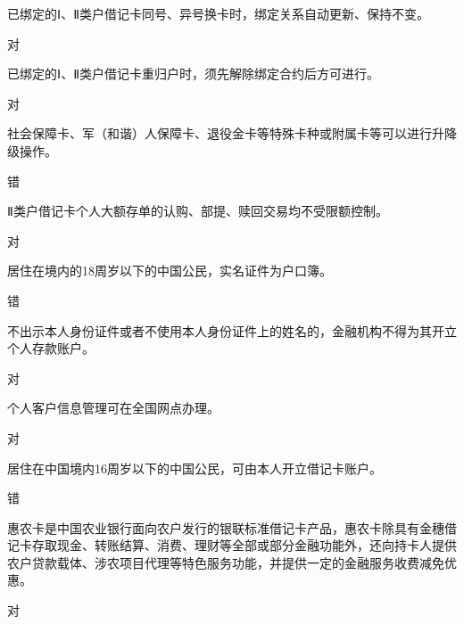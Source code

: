 \documentclass[kindlepaper]{BHCexam4kindle}
\begin{document}
\begin{questions}
\qs 已绑定的Ⅰ、Ⅱ类户借记卡同号、异号换卡时，绑定关系自动更新、保持不变。 \xx
\begin{solution} 对 \end{solution}
\qs 已绑定的Ⅰ、Ⅱ类户借记卡重归户时，须先解除绑定合约后方可进行。 \xx
\begin{solution} 对 \end{solution}
\qs 社会保障卡、军（和谐）人保障卡、退役金卡等特殊卡种或附属卡等可以进行升降级操作。 \xx
\begin{solution} 错 \end{solution}
\qs Ⅱ类户借记卡个人大额存单的认购、部提、赎回交易均不受限额控制。 \xx
\begin{solution} 对 \end{solution}
\qs 居住在境内的18周岁以下的中国公民，实名证件为户口簿。 \xx
\begin{solution} 错 \end{solution}
\qs 不出示本人身份证件或者不使用本人身份证件上的姓名的，金融机构不得为其开立个人存款账户。 \xx
\begin{solution} 对 \end{solution}
\qs 个人客户信息管理可在全国网点办理。 \xx
\begin{solution} 对 \end{solution}
\qs 居住在中国境内16周岁以下的中国公民，可由本人开立借记卡账户。 \xx
\begin{solution} 错 \end{solution}
\qs 惠农卡是中国农业银行面向农户发行的银联标准借记卡产品，惠农卡除具有金穗借记卡存取现金、转账结算、消费、理财等全部或部分金融功能外，还向持卡人提供农户贷款载体、涉农项目代理等特色服务功能，并提供一定的金融服务收费减免优惠。 \xx
\begin{solution} 对 \end{solution}

\end{questions}
\end{document}
